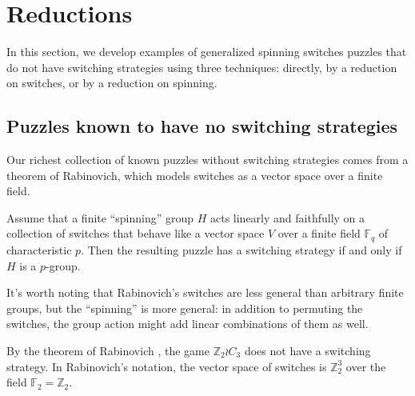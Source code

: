


\section{Reductions}
\label{sec:Reductions}
In this section, we develop examples of generalized spinning switches puzzles
that do not have switching strategies using three techniques:
directly, by a reduction on switches, or by a reduction on spinning.
%
\subsection{Puzzles known to have no switching strategies}
Our richest collection of known puzzles without switching strategies comes from
a theorem of Rabinovich, which models switches as a vector space over
a finite field.
\begin{theorem} \cite{Rabinovich2022}
  Assume that a finite ``spinning'' group $H$ acts linearly and faithfully on
  a collection of switches that behave like a vector space
  $V$ over a finite field $\mathbb F_q$ of characteristic $p$.
  Then the resulting puzzle has a switching strategy if and only if $H$ is a
  $p$-group.
  \label{thm:Rabinovich}
\end{theorem}
It's worth noting that Rabinovich's switches are less general than arbitrary
finite groups, but the ``spinning'' is more general: in addition to permuting
the switches, the group action might add linear combinations of them as well.
\begin{example}
  By the theorem of Rabinovich \cite{Rabinovich2022},
  the game $\mathbb Z_2 \wr C_3$ does not have a
  switching strategy. In Rabinovich's notation, the vector space of switches
  is $\mathbb Z_2^3$ over the field $\mathbb F_2 = \mathbb Z_2$.
  \label{ex:NoSolutionZ2C3}
\end{example}

